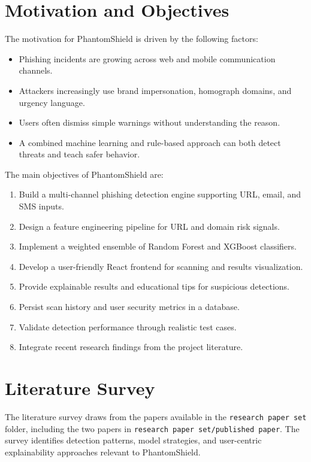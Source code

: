 \documentclass[conference]{IEEEtran}
\begin{document}
\section{Motivation and Objectives}
The motivation for PhantomShield is driven by the following factors:
\begin{itemize}[itemsep=0pt,topsep=0pt]
    \item Phishing incidents are growing across web and mobile communication channels.
    \item Attackers increasingly use brand impersonation, homograph domains, and urgency language.
    \item Users often dismiss simple warnings without understanding the reason.
    \item A combined machine learning and rule-based approach can both detect threats and teach safer behavior.
\end{itemize}

The main objectives of PhantomShield are:
\begin{enumerate}[itemsep=0pt,topsep=0pt]
    \item Build a multi-channel phishing detection engine supporting URL, email, and SMS inputs.
    \item Design a feature engineering pipeline for URL and domain risk signals.
    \item Implement a weighted ensemble of Random Forest and XGBoost classifiers.
    \item Develop a user-friendly React frontend for scanning and results visualization.
    \item Provide explainable results and educational tips for suspicious detections.
    \item Persist scan history and user security metrics in a database.
    \item Validate detection performance through realistic test cases.
    \item Integrate recent research findings from the project literature.
\end{enumerate}

\section{Literature Survey}
The literature survey draws from the papers available in the \texttt{research paper set} folder, including the two papers in \texttt{research paper set/published paper}. The survey identifies detection patterns, model strategies, and user-centric explainability approaches relevant to PhantomShield.
\end{document}

